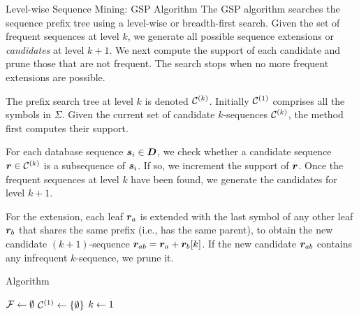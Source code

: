 \begin{frame}{Level-wise Sequence Mining: GSP Algorithm}
\small
  The GSP algorithm searches the sequence pref\/{i}x tree using a
  level-wise or breadth-f\/{i}rst search.  Given the set of frequent
  sequences at level $k$, we generate all possible sequence extensions
  or {\em candidates} at level $k+1$.  We next compute the support of
  each candidate and prune those that are not frequent. The search stops
  when no more frequent extensions are possible.

\medskip
  The pref\/{i}x search tree at level $k$ is
denoted ${\mathcal C}^{(k)}$. Initially ${\mathcal C}^{(1)}$ comprises all the symbols in
$\Sigma$. Given the current set of candidate $k$-sequences ${\mathcal C}^{(k)}$, the
method f\/{i}rst computes their support.

\medskip
For each database sequence ${\boldsymbol s}_i
\in {\boldsymbol D}$, we check whether a  candidate sequence ${\boldsymbol r} \in {\mathcal C}^{(k)}$
is a subsequence of ${\boldsymbol s}_i$. If so, we increment the support of ${\boldsymbol r}$.
Once the frequent sequences at level $k$ have been found, we generate
the candidates for level $k+1$.

\medskip
For the extension, each leaf ${\boldsymbol r}_a$ is extended with the last symbol of
any other leaf ${\boldsymbol r}_b$ that shares the same pref\/{i}x (i.e., has the same
parent), to obtain the new candidate $(k+1)$-sequence
${\boldsymbol r}_{ab} = {\boldsymbol r}_a + {\boldsymbol r}_b[k]$.
If the new candidate ${\boldsymbol r}_{ab}$ contains any infrequent $k$-sequence, we
prune it.
\end{frame}


\begin{frame}[fragile]{Algorithm \alggsp}
\begin{tightalgo}[H]{\textwidth-18pt}
\AlgorithmA{}
${\mathcal F} \leftarrow \emptyset$\;
${\mathcal C}^{(1)} \leftarrow \{\emptyset\}$ 
$k \leftarrow 1$ 
\end{tightalgo}
\end{frame}


